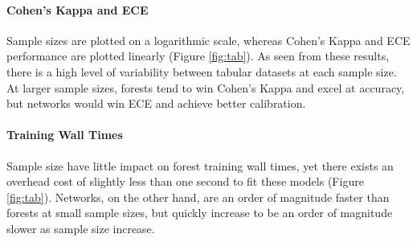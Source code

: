 \paragraph{Cohen's Kappa and ECE}
Sample sizes are plotted on a logarithmic scale, whereas Cohen's Kappa and ECE performance are plotted linearly (Figure \ref{fig:tab}). As seen from these results, there is a high level of variability between tabular datasets at each sample size. At larger sample sizes, forests tend to win Cohen's Kappa and excel at accuracy, but networks would win ECE and achieve better calibration.

\paragraph{Training Wall Times}
Sample size have little impact on forest training wall times, yet there exists an overhead cost of slightly less than one second to fit these models (Figure \ref{fig:tab}). Networks, on the other hand, are an order of magnitude faster than forests at small sample sizes, but quickly increase to be an order of magnitude slower as sample size increase.

